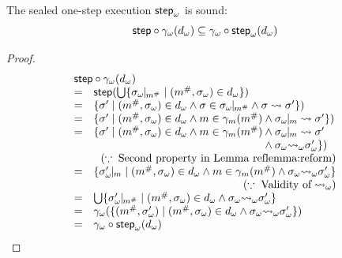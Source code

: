 \begin{lemma}\label{lemma:sound-symbstep}
  The sealed one-step execution ${\textsf{step}}_\omega$ is sound:
  \[
    \textsf{step} \circ {\gamma}_\omega({{d}_\omega}) \subseteq
    {\gamma}_\omega \circ {\textsf{step}}_\omega({{d}_\omega})\\
  \]
\end{lemma}
\begin{proof}
  \[
    \begin{array}{cl}
      \multicolumn{2}{l}{\step \circ \symbgamma(\symbelem)}\\
      =& \step(\bigcup \{ \instant{\symbst}{\absimap} \mid (\absimap, \symbst) \in
      \symbelem\})\\
      =& \{ \st' \mid (\absimap, \symbst) \in \symbelem \wedge \st \in
      \instant{\symbst}{\absimap} \wedge \st \trans \st'\})\\
      =& \{ \st' \mid (\absimap, \symbst) \in \symbelem \wedge \imap \in
      \imapgamma(\absimap) \wedge \instant{\symbst}{\imap} \trans \st'\})\\
      =& \{ \st' \mid (\absimap, \symbst) \in \symbelem \wedge \imap \in
      \imapgamma(\absimap) \wedge \instant{\symbst}{\imap} \trans \st'\\
       & \phantom{\{ \st' \mid (\absimap, \symbst) \in \symbelem \wedge \imap \in
      \imapgamma(\absimap)} \wedge \symbst \symbtrans \symbst' \})\\
       & \multicolumn{1}{r}{(\because \; \text{Second property in
       Lemma~ref{lemma:reform}})}\\
      =& \{ \instant{\symbst'}{\imap} \mid (\absimap, \symbst)
      \in \symbelem \wedge \imap \in \imapgamma(\absimap) \wedge \symbst
      \symbtrans \symbst'\}\\
      & \multicolumn{1}{r}{(\because \; \text{Validity of} \; \symbtrans)}\\
      =& \bigcup \{ \instant{\symbst'}{\absimap} \mid (\absimap, \symbst)
      \in \symbelem \wedge \symbst \symbtrans \symbst' \}\\
      =& \symbgamma(\{ (\absimap, \symbst') \mid (\absimap, \symbst)
      \in \symbelem \wedge \symbst \symbtrans \symbst' \})\\
      =& \symbgamma \circ \symbstep(\symbelem)\\
    \end{array}
  \]
\end{proof}

